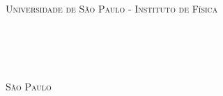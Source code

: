 \begin{titlepage}
\begin{fullwidth}
\begin{center}


\textsc{\LARGE Universidade de São Paulo - Instituto de Física}\\[2cm]

\HRule \\[0.2cm]
\textsc{\textit{\titlefont {\titletext:}\\[0.0cm] \subtitlefont {\subtitletext}}}
\HRule\\[1.2cm]
\textsc{\LARGE \authorinfo }\\[1.cm]



\vfill

\textsc{\LARGE São Paulo}\\
\textsc{\LARGE \the\year}

\end{center}
\end{fullwidth}
\end{titlepage}
